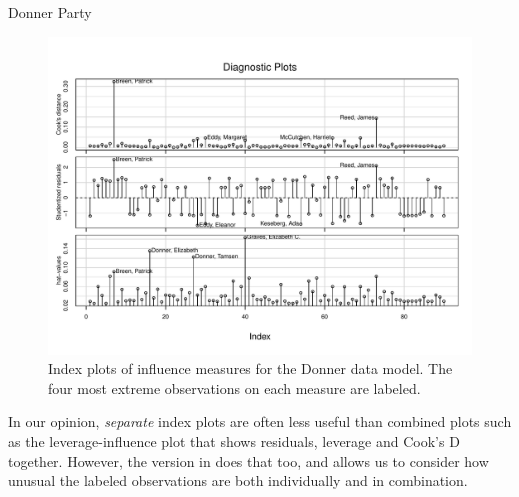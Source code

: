 \documentclass[11pt]{book}
\renewenvironment{knitrout}{\small\renewcommand{\baselinestretch}{.85}}{} %
\begin{document}
\begin{Example}[donner2]{Donner Party}
\begin{knitrout}
\begin{figure}[!htbp]
\centerline{\includegraphics[width=.8\textwidth]{ch07/fig/donner2-indexinfl} }

\caption[Index plots of influence measures for the Donner data model]{Index plots of influence measures for the Donner data model. The four most extreme observations on each measure are labeled.\label{fig:donner2-indexinfl}}
\end{figure}


\end{knitrout}
In our opinion, \emph{separate} index plots are often less useful than combined plots such as
the leverage-influence plot that shows residuals, leverage and Cook's D together.
However, the  version in 
does that too, and allows us to consider how unusual the labeled observations are both individually and in combination.

\end{Example}
\end{document}
